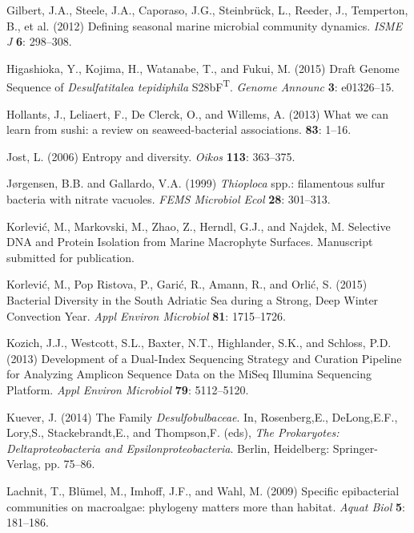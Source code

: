 \documentclass[12pt,]{article}
\begin{document}
\leavevmode\hypertarget{ref-Gilbert2012}{}%
Gilbert, J.A., Steele, J.A., Caporaso, J.G., Steinbrück, L., Reeder, J.,
Temperton, B., et al. (2012) Defining seasonal marine microbial
community dynamics. \emph{ISME J} \textbf{6}: 298--308.

\leavevmode\hypertarget{ref-Higashioka2015}{}%
Higashioka, Y., Kojima, H., Watanabe, T., and Fukui, M. (2015) Draft
Genome Sequence of \emph{Desulfatitalea tepidiphila}
S28bF\textsuperscript{T}. \emph{Genome Announc} \textbf{3}: e01326--15.

\leavevmode\hypertarget{ref-Hollants2013}{}%
Hollants, J., Leliaert, F., De Clerck, O., and Willems, A. (2013) What
we can learn from sushi: a review on seaweed-bacterial associations.
\textbf{83}: 1--16.

\leavevmode\hypertarget{ref-Jost2006}{}%
Jost, L. (2006) Entropy and diversity. \emph{Oikos} \textbf{113}:
363--375.

\leavevmode\hypertarget{ref-Jorgensen1999}{}%
Jørgensen, B.B. and Gallardo, V.A. (1999) \emph{Thioploca} spp.:
filamentous sulfur bacteria with nitrate vacuoles. \emph{FEMS Microbiol
Ecol} \textbf{28}: 301--313.

\leavevmode\hypertarget{ref-Korlevic_submitted}{}%
Korlević, M., Markovski, M., Zhao, Z., Herndl, G.J., and Najdek, M.
Selective DNA and Protein Isolation from Marine Macrophyte Surfaces.
Manuscript submitted for publication.

\leavevmode\hypertarget{ref-Korlevic2015}{}%
Korlević, M., Pop Ristova, P., Garić, R., Amann, R., and Orlić, S.
(2015) Bacterial Diversity in the South Adriatic Sea during a Strong,
Deep Winter Convection Year. \emph{Appl Environ Microbiol} \textbf{81}:
1715--1726.

\leavevmode\hypertarget{ref-Kozich2013}{}%
Kozich, J.J., Westcott, S.L., Baxter, N.T., Highlander, S.K., and
Schloss, P.D. (2013) Development of a Dual-Index Sequencing Strategy and
Curation Pipeline for Analyzing Amplicon Sequence Data on the MiSeq
Illumina Sequencing Platform. \emph{Appl Environ Microbiol} \textbf{79}:
5112--5120.

\leavevmode\hypertarget{ref-Kuever2014}{}%
Kuever, J. (2014) The Family \emph{Desulfobulbaceae}. In, Rosenberg,E.,
DeLong,E.F., Lory,S., Stackebrandt,E., and Thompson,F. (eds), \emph{The
Prokaryotes: Deltaproteobacteria and Epsilonproteobacteria}. Berlin,
Heidelberg: Springer-Verlag, pp. 75--86.

\leavevmode\hypertarget{ref-Lachnit2009}{}%
Lachnit, T., Blümel, M., Imhoff, J.F., and Wahl, M. (2009) Specific
epibacterial communities on macroalgae: phylogeny matters more than
habitat. \emph{Aquat Biol} \textbf{5}: 181--186.
\end{document}
